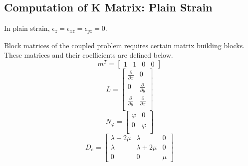 \documentclass[12pt]{article}
\begin{document}
\subsection{Computation of K Matrix: Plain Strain}

In plain strain, $\epsilon_z = \epsilon_{xz}= \epsilon_{yz} = 0$. 


Block matrices of the coupled problem requires certain matrix building blocks. These matrices and their coefficients are defined below.
%
\begin{equation}	\label{eq42ba}
m^T=\left[
\begin{array}{cccccc}
1&1&0&0
\end{array}
\right]
\end{equation}
%
\begin{equation}	\label{eq43a}
L = \left[
\begin{array}{cc}
\frac{\partial}{\partial x} & 0   			\\
0 &\frac{\partial}{\partial y} 				\\
\frac{\partial}{\partial y} & \frac{\partial}{\partial x}   			\\
\end{array}
\right]
\end{equation}
%
\begin{equation}	\label{eq44a}
N_{\varphi} =\left[
\begin{array}{cc}
\varphi & 0   			\\
0 &\varphi  				\\
\end{array}
\right]
\end{equation}
%
\begin{equation}	\label{eq45a}
D_e = 
\left[
\begin{array}{ccc}
\lambda+2\mu & \lambda & 0 			\\
\lambda & \lambda+2\mu & 0 			\\
0 & 0 & \mu 		
\end{array}
\right]
\end{equation}
\newline
\newline
%
\newline
\end{document}
